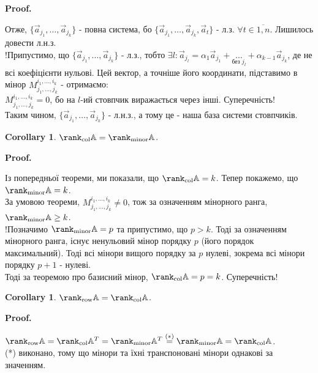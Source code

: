 \documentclass[a4paper, 10pt]{article}
\makeatletter
\theoremstyle{theoremdd}
\newtheorem{corollary}[theorem]{Corollary}
\renewenvironment{proof}[1][Proof.\\]{\par
\pushQED{\hfill \qed}%
\normalfont \topsep6\p@\@plus6\p@\relax
\trivlist
\item\relax
{\bfseries
#1\@addpunct{.}}\hspace\labelsep\ignorespaces
}{%
\popQED\endtrivlist\@endpefalse
}
\makeatother
\begin{document}
\begin{proof}
Отже, $\{\vec{a}_{j_1},\dots,\vec{a}_{j_k}\}$ - повна система, бо $\{\vec{a}_{j_1},\dots,\vec{a}_{j_k}, \vec{a}_t\}$ - л.з. $\forall t \in \overline{1,n}$. Лишилось довести л.н.з.\\
!Припустимо, що $\{\vec{a}_{j_1},\dots,\vec{a}_{j_k}\}$ - л.з., тобто $\exists l: \vec{a}_{j_l} = \alpha_1 \vec{a}_{j_1} + \underset{\text{без }j_l}{\dots} + \alpha_{k-1} \vec{a}_{j_k}$, де не всі коефіцієнти нульові. Цей вектор, а точніше його координати, підставимо в мінор $M_{j_1,\dots,j_k}^{i_1,\dots,i_k}$ - отримаємо:\\
$M_{j_1,\dots,j_k}^{i_1,\dots,i_k} = 0$, бо на $l$-ий стовпчик виражається через інші. Суперечність!\\
Таким чином, $\{\vec{a}_{j_1},\dots,\vec{a}_{j_k}\}$ - л.н.з., а тому це - наша база системи стовпчиків.
\end{proof}

\begin{corollary}
$\rank_{\text{col}} \mathbb{A} = \rank_{\text{minor}} \mathbb{A}$.
\end{corollary}

\begin{proof}
Із попередньої теореми, ми показали, що $\rank_{\text{col}} \mathbb{A} = k$. Тепер покажемо, що $\rank_{\text{minor}} \mathbb{A} = k$.\\
За умовою теореми, $M_{j_1,\dots,j_k}^{i_1,\dots,i_k} \neq 0$, тож за означенням мінорного ранга, $\rank_{\text{minor}} \mathbb{A} \geq k$.\\
!Позначимо $\rank_{\text{minor}} \mathbb{A} = p$ та припустимо, що $p > k$. Тоді за означенням мінорного ранга, існує ненульовий мінор порядку $p$ (його порядок максимальний). Тоді всі мінори вищого порядку за $p$ нулеві, зокрема всі мінори порядку $p+1$ - нулеві.\\
Тоді за теоремою про базисний мінор, $\rank_{\text{col}} \mathbb{A} = p = k$. Суперечність!
\end{proof}

\begin{corollary}
$\rank_{\textrm{row}} \mathbb{A} = \rank_{\textrm{col}} \mathbb{A}$.
\end{corollary}

\begin{proof}
$\rank_{\textrm{row}} \mathbb{A} = \rank_{\textrm{col}} \mathbb{A}^T = \rank_{\textrm{minor}} \mathbb{A}^T \overset{(*)}{=} \rank_{\textrm{minor}} \mathbb{A} = \rank_{\textrm{col}} \mathbb{A}$.\\
(*) виконано, тому що мінори та їхні транспоновані мінори однакові за значенням.
\end{proof}
\end{document}
